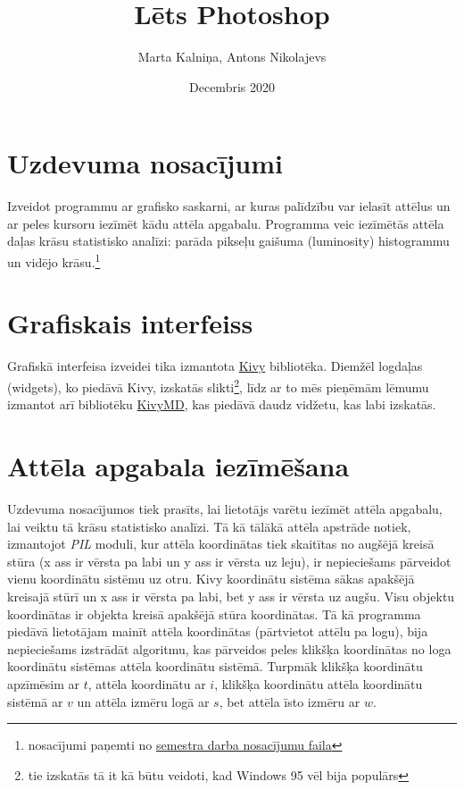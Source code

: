 \documentclass{article}
\title{Lēts Photoshop}
\author{Marta Kalniņa, Antons Nikolajevs }
\date{Decembris 2020}
\begin{document}
\maketitle

\section{Uzdevuma nosacījumi}
Izveidot programmu ar grafisko saskarni, ar kuras palīdzību var ielasīt attēlus un ar peles kursoru iezīmēt kādu attēla apgabalu. Programma veic iezīmētās attēla daļas krāsu statistisko analīzi: parāda pikseļu gaišuma (luminosity) histogrammu un vidējo krāsu.\footnote{nosacījumi paņemti no 
 \href{https://estudijas.lu.lv/pluginfile.php/910084/mod_resource/content/2/semestra_darbi_2020.pdf}{semestra darba nosacījumu faila}}
\section{Grafiskais interfeiss}
Grafiskā interfeisa izveidei tika izmantota \href{https://kivy.org/#home}{Kivy} bibliotēka. Diemžēl logdaļas (widgets), ko piedāvā Kivy, izskatās slikti\footnote{tie izskatās tā it kā būtu veidoti, kad Windows 95 vēl bija populārs}, līdz ar to mēs pieņēmām lēmumu izmantot arī bibliotēku \href{https://github.com/kivymd/KivyMD}{KivyMD}, kas piedāvā daudz vidžetu, kas labi izskatās.

\section{Attēla apgabala iezīmēšana}
Uzdevuma nosacījumos tiek prasīts, lai lietotājs varētu iezīmēt attēla apgabalu, lai veiktu tā krāsu statistisko analīzi.
Tā kā tālākā attēla apstrāde notiek, izmantojot \textit{PIL} moduli, kur attēla koordinātas tiek skaitītas no augšējā kreisā stūra (x ass ir vērsta pa labi un y ass ir vērsta uz leju), ir nepieciešams pārveidot vienu koordinātu sistēmu uz otru. Kivy koordinātu sistēma sākas apakšējā kreisajā stūrī un x ass ir vērsta pa labi, bet y ass ir vērsta uz augšu. Visu objektu koordinātas ir objekta kreisā apakšējā stūra koordinātas. Tā kā programma piedāvā lietotājam mainīt attēla koordinātas (pārtvietot attēlu pa logu), bija nepieciešams izstrādāt algoritmu, kas pārveidos peles klikšķa koordinātas no loga koordinātu sistēmas attēla koordinātu sistēmā. Turpmāk klikšķa koordinātu apzīmēsim ar $t$, attēla koordinātu ar $i$, klikšķa koordinātu attēla koordinātu sistēmā ar $v$ un attēla izmēru logā ar $s$, bet attēla īsto izmēru ar $w$.
\end{document}
